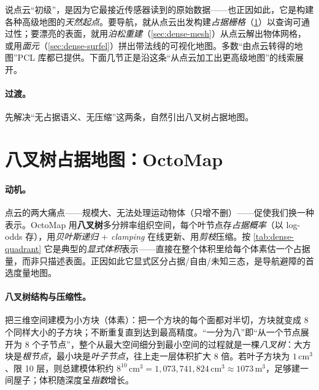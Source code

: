 \begin{insight}[点云是一切高级地图的出发点]
说点云“初级”，是因为它最接近传感器读到的原始数据——也正因如此，它是构建各种高级地图的\emph{天然起点}。要导航，就从点云出发构建\emph{占据栅格}（\cref{sec:dense-octomap}）以查询可通过性；要漂亮的表面，就用\emph{泊松重建}（\cref{sec:dense-mesh}）从点云解出物体网格，或用\emph{面元}（\cref{sec:dense-surfel}）拼出带法线的可视化地图。多数“由点云转得的地图”PCL 库都已提供\cite{rusu2011pcl}。下面几节正是沿这条“从点云加工出更高级地图”的线索展开。
\end{insight}

\paragraph{过渡。}
先解决“无占据语义、无压缩”这两条，自然引出八叉树占据地图。

\section{八叉树占据地图：OctoMap}
\label{sec:dense-octomap}

\paragraph{动机。}
点云的两大痛点——规模大、无法处理运动物体（只增不删）——促使我们换一种表示\cite{gaoxiang2019slam14}。OctoMap\cite{hornung2013octomap} 用\textbf{八叉树}多分辨率组织空间，每个叶节点存\emph{占据概率}（以 log-odds 存），用\emph{贝叶斯递归 $+$ clamping} 在线更新、用\emph{剪枝}压缩。按 \cref{tab:dense-quadrant} 它是典型的\emph{显式体积}表示——直接在整个体积里给每个体素估一个占据量，而非只描述表面。正因如此它显式区分占据/自由/未知三态，是导航避障的首选度量地图。

\paragraph{八叉树结构与压缩性。}
把三维空间建模为小方块（体素）：把一个方块的每个面都对半切，方块就变成 8 个同样大小的子方块；不断重复直到达到最高精度。“一分为八”即“从一个节点展开为 8 个子节点”，整个从最大空间细分到最小空间的过程就是一棵\emph{八叉树}：大方块是\emph{根节点}，最小块是\emph{叶子节点}，往上走一层体积扩大 8 倍。若叶子方块为 $1\,\mathrm{cm}^3$、限 10 层，则总建模体积约 $8^{10}\,\mathrm{cm}^3 = 1{,}073{,}741{,}824\,\mathrm{cm}^3\approx 1073\,\mathrm{m}^3$，足够建一间屋子；体积随深度呈\emph{指数}增长。

